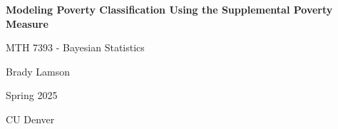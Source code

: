 \begin{titlepage}
	\centering
    \vspace*{\fill}
	{\huge\bfseries Modeling Poverty Classification Using the Supplemental Poverty Measure\par}
    \vspace{1cm}
    {\Large MTH 7393 - Bayesian Statistics\par}
	\vspace{1cm}
	{\Large Brady Lamson\par}
    \vspace{1cm}
    {\Large Spring 2025}
	\vfill


	{\large CU Denver\par}
\end{titlepage}